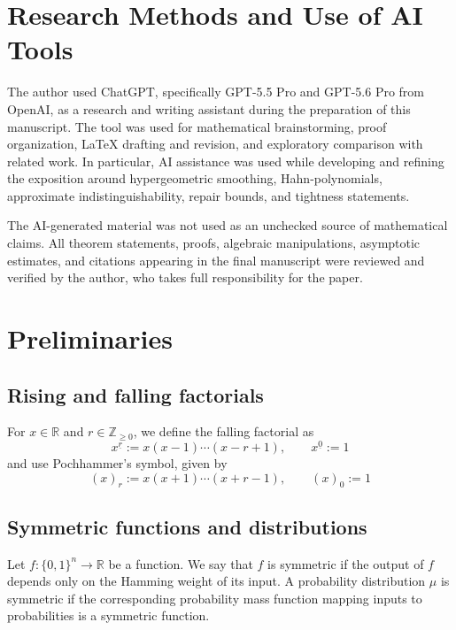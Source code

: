 \documentclass[manuscript,nonacm]{acmart}
\begin{document}
\section{Research Methods and Use of AI Tools}
\label{sec:research-methods-ai}
The author used ChatGPT, specifically GPT-5.5 Pro and GPT-5.6 Pro from OpenAI, as a
research and writing assistant during the preparation of this manuscript.
The tool was used for mathematical brainstorming, proof organization,
LaTeX drafting and revision, and exploratory comparison with related work. In particular, AI assistance was used while
developing and refining the exposition around hypergeometric smoothing,
Hahn-polynomials, approximate indistinguishability,
repair bounds, and tightness statements.

The AI-generated material was not used as an unchecked source of
mathematical claims. All theorem statements, proofs, algebraic
manipulations, asymptotic estimates, and citations appearing in the final
manuscript were reviewed and verified by the author, who takes full responsibility for the paper.

\section{Preliminaries}
\label{s:prelim}
\subsection{Rising and falling factorials}
For $x \in \mathbb{R}$ and $r \in \mathbb{Z}_{\geq 0}$, we define the falling factorial as
\[
    x^{\underline{r}}
    :=
    x(x-1)\cdots(x-r+1),
    \qquad
    x^{\underline 0}:=1
\]
and use Pochhammer’s symbol, given by
\[
(x)_r := x(x+1)\cdots(x+r-1),
\qquad
(x)_0 := 1
\]

\subsection{Symmetric functions and distributions}
\label{s:symmetry}
Let $f : \{0,1\}^n \to \mathbb{R}$ be a function.
We say that $f$ is symmetric if the output of $f$ depends only on the Hamming weight of its input.
A probability distribution $\mu$ is symmetric if the corresponding probability mass function mapping inputs to probabilities is a symmetric function.
\end{document}
